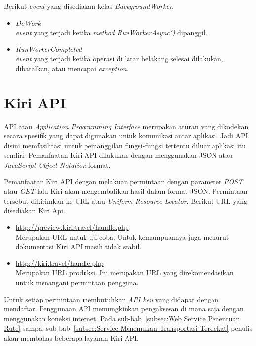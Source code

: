 Berikut \textit{event} yang disediakan kelas \textit{BackgroundWorker}.
\begin{itemize}
	\item \textit{DoWork} \\
	\textit{event} yang terjadi ketika \textit{method RunWorkerAsync()} dipanggil.
	\item \textit{RunWorkerCompleted} \\
	\textit{event} yang terjadi ketika operasi di latar belakang selesai dilakukan, dibatalkan, atau mencapai \textit{exception}.
\end{itemize}

\section{Kiri API}
\label{sec:Kiri API}
\hspace{0.5cm} API atau \textit{Application Programming Interface} merupakan aturan yang dikodekan secara spesifik yang dapat digunakan untuk komunikasi antar aplikasi. Jadi API disini memfasilitasi untuk pemanggilan fungsi-fungsi tertentu diluar aplikasi itu sendiri. Pemanfaatan Kiri API dilakukan dengan menggunakan JSON atau \textit{JavaScript Object Notation} format. 

Pemanfaatan Kiri API dengan melakuan permintaan dengan parameter \textit{POST} atau \textit{GET} lalu Kiri akan mengembalikan hasil dalam format JSON. Permintaan tersebut dikirimkan ke URL atau \textit{Uniform Resource Locator}. Berikut URL yang disediakan Kiri Api.
\begin{itemize}
	\item \url{http://preview.kiri.travel/handle.php} \\
	Merupakan URL untuk uji coba. Untuk kemampuannya juga menurut dokumentasi Kiri API masih tidak stabil.
	\item \url{http://kiri.travel/handle.php} \\
	Merupakan URL produksi. Ini merupakan URL yang direkomendasikan untuk menangani permintaan pengguna.
\end{itemize}
Untuk setiap permintaan membutuhkan \textit{API key} yang didapat dengan mendaftar\cite{Kiri}. Penggunaan API memungkinkan pengaksesan di mana saja dengan menggunakan koneksi internet. Pada sub-bab~\ref{subsec:Web Service Penentuan Rute} sampai sub-bab~\ref{subsec:Service Menemukan Transportasi Terdekat} penulis akan membahas beberapa layanan Kiri API.

